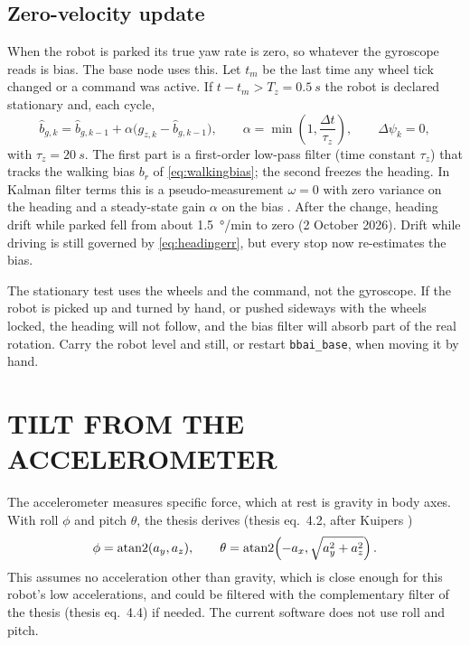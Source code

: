 \subsection{Zero-velocity update}
\label{sec:zupt}

When the robot is parked its true yaw rate is zero, so whatever the gyroscope
reads is bias. The base node uses this. Let $t_m$ be the last time any wheel
tick changed or a  command was active. If
$t-t_m>T_z=\SI{0.5}{s}$ the robot is declared stationary and, each cycle,
\begin{equation}\label{eq:zupt}
\hat b_{g,k} = \hat b_{g,k-1} + \alpha\bigl(g_{z,k}-\hat b_{g,k-1}\bigr),
\qquad \alpha=\min\!\left(1,\frac{\Delta t}{\tau_z}\right),
\qquad \Delta\psi_k = 0,
\end{equation}
with $\tau_z=\SI{20}{s}$. The first part is a first-order low-pass filter
(time constant $\tau_z$) that tracks the walking bias $b_r$ of
\eqref{eq:walkingbias}; the second freezes the heading. In Kalman filter terms
this is a pseudo-measurement $\omega=0$ with zero variance on the heading and a
steady-state gain $\alpha$ on the bias \cite{groves2013principles}. After the
change, heading drift while parked fell from about \SI{1.5}{\degree/min} to
zero (2 October 2026). Drift while driving is still governed by
\eqref{eq:headingerr}, but every stop now re-estimates the bias.

\begin{remark}
The stationary test uses the wheels and the command, not the gyroscope. If the
robot is picked up and turned by hand, or pushed sideways with the wheels
locked, the heading will not follow, and the bias filter will absorb part of
the real rotation. Carry the robot level and still, or restart
\texttt{bbai\_base}, when moving it by hand.
\end{remark}

\section{TILT FROM THE ACCELEROMETER}

The accelerometer measures specific force, which at rest is gravity in body
axes. With roll $\phi$ and pitch $\theta$, the thesis derives (thesis
eq.~4.2, after Kuipers \cite{kuipers1999quaternions})
\begin{equation}\label{eq:rollpitch}
\phi=\operatorname{atan2}(a_y,a_z),\qquad
\theta=\operatorname{atan2}\!\left(-a_x,\sqrt{a_y^2+a_z^2}\right).
\end{equation}
This assumes no acceleration other than gravity, which is close enough for
this robot's low accelerations, and could be filtered with the complementary
filter of the thesis (thesis eq.~4.4) if needed. The current software does
not use roll and pitch.

